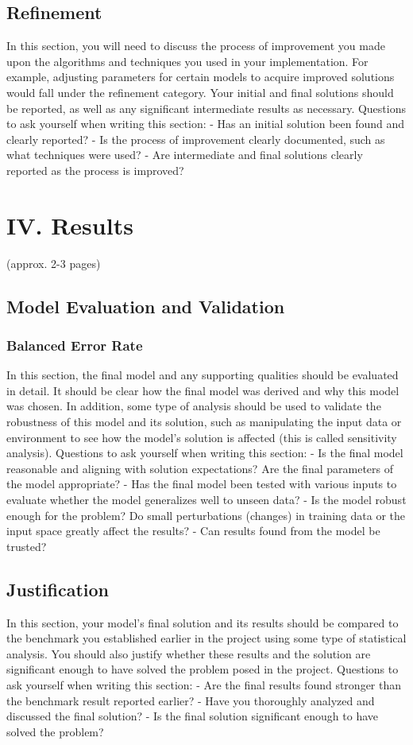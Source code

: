 \documentclass[12pt]{article}
\begin{document}
\subsection{Refinement}
In this section, you will need to discuss the process of improvement you made upon the algorithms and techniques you used in your implementation. For example, adjusting parameters for certain models to acquire improved solutions would fall under the refinement category. Your initial and final solutions should be reported, as well as any significant intermediate results as necessary. Questions to ask yourself when writing this section:
- Has an initial solution been found and clearly reported?
- Is the process of improvement clearly documented, such as what techniques were used?
- Are intermediate and final solutions clearly reported as the process is improved?


\section{IV. Results}
(approx. 2-3 pages)

\subsection{Model Evaluation and Validation}
\label{model_val}

\subsubsection{Balanced Error Rate}
In this section, the final model and any supporting qualities should be evaluated in detail. It should be clear how the final model was derived and why this model was chosen. In addition, some type of analysis should be used to validate the robustness of this model and its solution, such as manipulating the input data or environment to see how the model’s solution is affected (this is called sensitivity analysis). Questions to ask yourself when writing this section:
- Is the final model reasonable and aligning with solution expectations? Are the final parameters of the model appropriate?
- Has the final model been tested with various inputs to evaluate whether the model generalizes well to unseen data?
- Is the model robust enough for the problem? Do small perturbations (changes) in training data or the input space greatly affect the results?
- Can results found from the model be trusted?

\subsection{Justification}
In this section, your model’s final solution and its results should be compared to the benchmark you established earlier in the project using some type of statistical analysis. You should also justify whether these results and the solution are significant enough to have solved the problem posed in the project. Questions to ask yourself when writing this section:
- Are the final results found stronger than the benchmark result reported earlier?
- Have you thoroughly analyzed and discussed the final solution?
- Is the final solution significant enough to have solved the problem?
\end{document}
